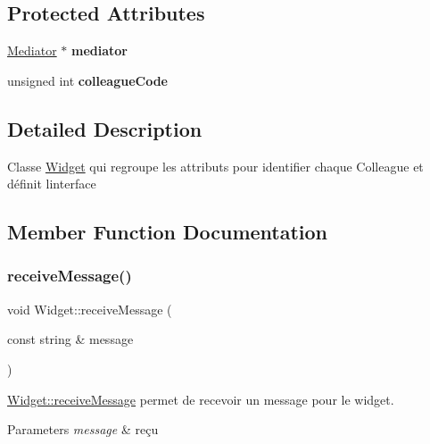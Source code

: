 \subsection*{Protected Attributes}
\begin{DoxyCompactItemize}
\item 
\mbox{\label{classWidget_a4b00dc8bd9a954f49082d3d1db5f3d01}} 
\hyperlink{classMediator}{Mediator} $\ast$ {\bfseries mediator}
\item 
\mbox{\label{classWidget_aaf728cdeb457d08deabd5fa4f9e06f24}} 
unsigned int {\bfseries colleague\+Code}
\end{DoxyCompactItemize}


\subsection{Detailed Description}
Classe \hyperlink{classWidget}{Widget} qui regroupe les attributs pour identifier chaque Colleague et définit l\textquotesingle{}interface 

\subsection{Member Function Documentation}
\mbox{\label{classWidget_aa985218b1841d00fedc817d44b81b2ac}} 
\subsubsection{\texorpdfstring{receive\+Message()}{receiveMessage()}}
{\footnotesize\ttfamily void Widget\+::receive\+Message (\begin{DoxyParamCaption}\item[{const string \&}]{message }\end{DoxyParamCaption})\hspace{0.3cm}{\ttfamily [virtual]}}



\hyperlink{classWidget_aa985218b1841d00fedc817d44b81b2ac}{Widget\+::receive\+Message} permet de recevoir un message pour le widget. 


\begin{DoxyParams}{Parameters}
{\em message} & reçu \\
\hline
\end{DoxyParams}
\mbox{\label{classWidget_a3f249ee26ae63058896027c045477804}} 
